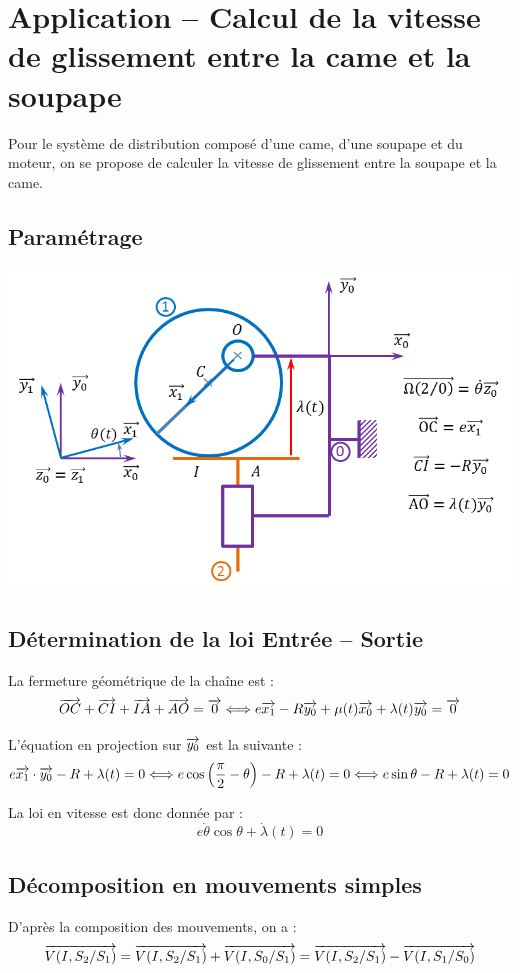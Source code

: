 \documentclass[10pt,oneside]{article}
\begin{document}

\section{Application -- Calcul de la vitesse de glissement entre la came et la soupape}
Pour le système de distribution composé d'une came, d'une soupape et du moteur, on se propose de calculer la vitesse de glissement entre la soupape et la came.
\subsection*{Paramétrage}
\begin{center}
\includegraphics[width=.7\textwidth]{png/parametrage} 
\end{center}

\subsection*{Détermination de la loi Entrée -- Sortie}
La fermeture géométrique de la chaîne est : 
$$
\overrightarrow{OC}+\overrightarrow{CI}+\overrightarrow{IA}+\overrightarrow{AO} = \overrightarrow{0} \Longleftrightarrow e\overrightarrow{x_1} -R\overrightarrow{y_0} + \mu(t)\overrightarrow{x_0}+\lambda(t) \overrightarrow{y_0} = \overrightarrow{0}
$$

L'équation en projection sur $\overrightarrow{y_0}$ est la suivante : 
$$
e\overrightarrow{x_1}\cdot \overrightarrow{y_0} -R +\lambda(t)  = 0 
\Longleftrightarrow e\cos\left(\dfrac{\pi}{2}-\theta \right) -R +\lambda(t)  = 0
\Longleftrightarrow e\sin \theta -R +\lambda(t)  = 0
$$

La loi en vitesse est donc donnée par :
$$
e\dot{\theta}\cos \theta +\dot{\lambda}(t)  = 0
$$

\subsection*{Décomposition en mouvements simples}
D'après la composition des mouvements, on a : 
$$
\overrightarrow{V(I,S_2/S_1)} = \overrightarrow{V(I,S_2/S_1)} + \overrightarrow{V(I,S_0/S_1)}
= \overrightarrow{V(I,S_2/S_1)} - \overrightarrow{V(I,S_1/S_0)}
$$
\end{document}
